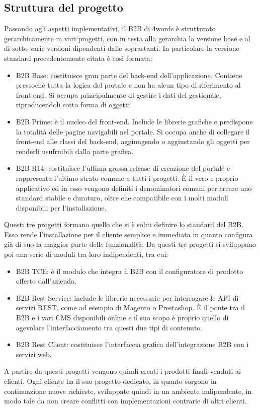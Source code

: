 \subsection{Struttura del progetto} \label{sec:b2b-struttura}
Passando agli aspetti implementativi, il B2B di 4words è strutturato gerarchicamente in vari progetti, con in testa alla gerarchia la versione base e al di sotto varie versioni dipendenti dalle soprastanti. In particolare la versione standard precedentemente citata è così formata:
\begin{itemize}
	\item B2B Base: costituisce gran parte del back-end dell'applicazione. Contiene pressoché tutta la logica del portale e non ha alcun tipo di riferimento al front-end. Si occupa principalmente di gestire i dati del gestionale, riproducendoli sotto forma di oggetti.
	\item B2B Prime: è il nucleo del front-end. Include le librerie grafiche e predispone la totalità delle pagine navigabili nel portale. Si occupa anche di collegare il front-end alle classi del back-end, aggiungendo o aggiustando gli oggetti per renderli usufruibili dalla parte grafica.
	\item B2B R14: costituisce l'ultima grossa release di creazione del portale e rappresenta l'ultimo strato comune a tutti i progetti. È il vero e proprio applicativo ed in esso vengono definiti i denominatori comuni per creare uno standard stabile e duraturo, oltre che compatibile con i molti moduli disponibili per l'installazione.
\end{itemize}
Questi tre progetti formano quello che si è soliti definire lo standard del B2B. Esso rende l'installazione per il cliente semplice e immediata in quanto configura già di suo la maggior parte delle funzionalità.
Da questi tre progetti si sviluppano poi una serie di moduli tra loro indipendenti, tra cui:
\begin{itemize}
	\item B2B TCE: è il modulo che integra il B2B con il configuratore di prodotto offerto dall'azienda.
	\item B2B Rest Service: include le librerie necessarie per interrogare le \Gls{API} di servizi \Gls{REST}, come ad esempio di \Gls{Magento} o \Gls{Prestashop}. È il ponte tra il B2B e i vari \Gls{CMS} disponibili online e il suo scopo è proprio quello di agevolare l'interfacciamento tra questi due tipi di contenuto.
	\item B2B Rest Client: costituisce l'interfaccia grafica dell'integrazione B2B con i servizi web.
\end{itemize}
A partire da questi progetti vengono quindi creati i prodotti finali venduti ai clienti. Ogni cliente ha il suo progetto dedicato, in quanto sorgono in continuazione nuove richieste, sviluppate quindi in un ambiente indipendente, in modo tale da non creare conflitti con implementazioni contrarie di altri clienti.


